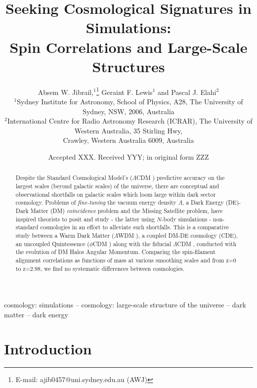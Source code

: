 \documentclass[a4paper,fleqn,usenatbib]{mnras}
\title[Seeking cosmological signatures in simulations]{ Seeking Cosmological Signatures in Simulations:\\ Spin Correlations and Large-Scale Structures }
\author[A. W. Jibrail et al.]{
Absem W. Jibrail,$^{1}$\thanks{E-mail: ajib0457@uni.sydney.edu.au (AWJ)}
Geraint F. Lewis$^{1}$
and Pascal J. Elahi$^{2}$
\\
$^{1}$Sydney Institute for Astronomy, School of Physics, A28, The University of Sydney, NSW, 2006, Australia\\
$^{2}$International Centre for Radio Astronomy Research (ICRAR), The University of Western Australia, 35 Stirling Hwy, \\
Crawley, Western Australia 6009, Australia}
\date{Accepted XXX. Received YYY; in original form ZZZ}
\def \lcdm{$\Lambda$CDM }
\def \lwdm{$\Lambda$WDM }
\def \qcdm{$\phi$CDM }
\begin{document}
\label{firstpage}
\pagerange{\pageref{firstpage}--\pageref{lastpage}}
\maketitle

\begin{abstract}
Despite the Standard Cosmological Model's (\lcdm) predictive accuracy on the largest scales (beyond galactic scales) of the universe, there are conceptual and observational shortfalls on galactic scales which loom large within dark sector cosmology. Problems of \textit{fine-tuning} the vacuum energy density $\Lambda$, a Dark Energy (DE)- Dark Matter (DM) \textit{coincidence} problem and the Missing Satellite problem, have inspired theorists to posit and study - the latter using $N$-body simulations - non-standard cosmologies in an effort to alleviate such shortfalls. This is a comparative study between a Warm Dark Matter (\lwdm), a coupled DM-DE cosmology (CDE), an uncoupled Quintessence (\qcdm) along with the fiducial \lcdm, conducted with the evolution of DM Halos Angular Momentum. Comparing the spin-filament alignment correlations as functions of mass at various smoothing scales and from z=0 to z=2.98, we find no systematic differences between cosmologies. 

\end{abstract}

\begin{keywords}
cosmology: simulations -- cosmology: large-scale structure of the universe -- dark matter -- dark energy
\end{keywords}



\section{Introduction}\label{intro}
\end{document}

